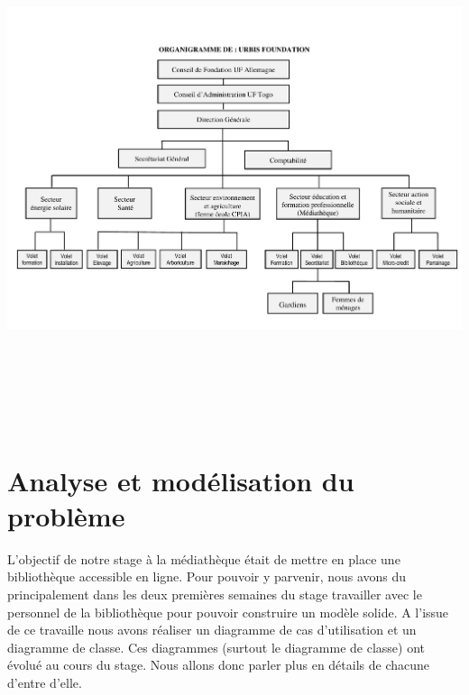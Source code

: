 \documentclass[12pt,a4paper]{article}
\begin{document}
\includegraphics[width=16cm,height=15cm]{./images/ORGANIGRAMME.pdf} 
\newpage
\section{Analyse et modélisation du problème}
L'objectif de notre stage à la médiathèque était de mettre en place une bibliothèque accessible en ligne. Pour pouvoir y parvenir, nous avons du principalement dans les deux premières semaines du stage travailler avec le personnel de la bibliothèque pour pouvoir construire un modèle solide. A l'issue 
de ce travaille nous avons réaliser un diagramme de cas d'utilisation et un 
diagramme de classe. Ces diagrammes (surtout le diagramme de classe) ont évolué
au cours du stage. Nous allons donc parler plus en détails de chacune d'entre d'elle.
\end{document}
